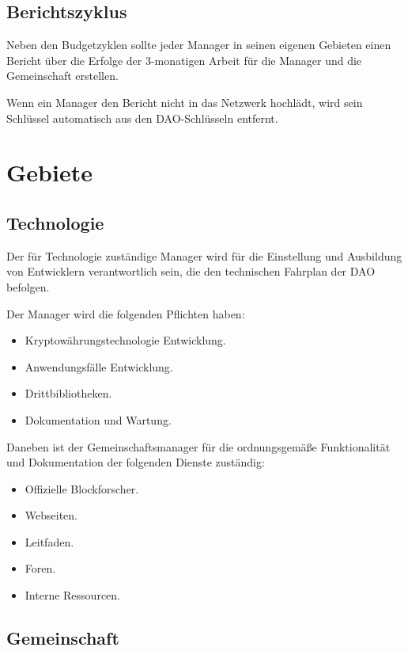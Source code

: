 \documentclass{article}
\begin{document}
\subsection{Berichtszyklus}

Neben den Budgetzyklen sollte jeder Manager in seinen eigenen Gebieten einen Bericht über die Erfolge der 3-monatigen Arbeit für die Manager und die Gemeinschaft erstellen.

Wenn ein Manager den Bericht nicht in das Netzwerk hochlädt, wird sein Schlüssel automatisch aus den DAO-Schlüsseln entfernt.

\section{Gebiete}

\subsection{Technologie}

Der für Technologie zuständige Manager wird für die Einstellung und Ausbildung von Entwicklern verantwortlich sein, die den technischen Fahrplan der DAO befolgen.

Der Manager wird die folgenden Pflichten haben:

\begin{itemize}
  \item Kryptowährungstechnologie Entwicklung.
  \item Anwendungsfälle Entwicklung.
  \item Drittbibliotheken.
  \item Dokumentation und Wartung.
\end{itemize}

Daneben ist der Gemeinschaftsmanager für die ordnungsgemäße Funktionalität und Dokumentation der folgenden Dienste zuständig:

\begin{itemize}
  \item Offizielle Blockforscher.
  \item Webseiten.
  \item Leitfaden.
  \item Foren.
  \item Interne Ressourcen.
\end{itemize}

\subsection{Gemeinschaft}
\end{document}
